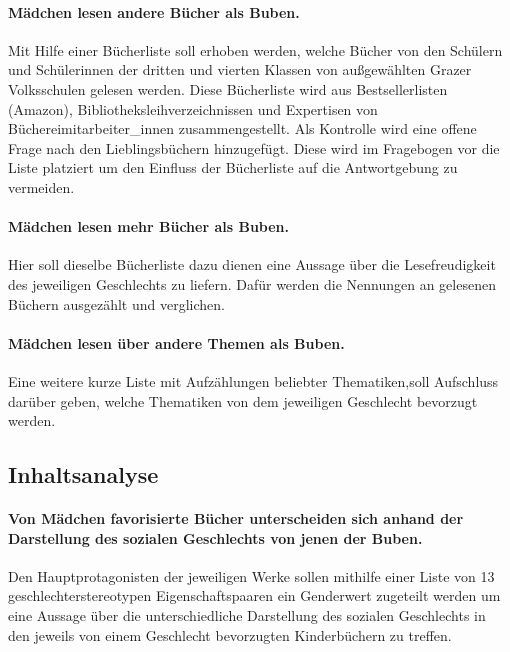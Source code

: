 \paragraph{Mädchen lesen andere Bücher als Buben.}

Mit Hilfe einer Bücherliste soll erhoben werden, welche Bücher von den
Schülern und Schülerinnen der dritten und vierten Klassen von
außgewählten Grazer Volksschulen gelesen werden. Diese Bücherliste wird
aus Bestsellerlisten (Amazon), Bibliotheksleihverzeichnissen und
Expertisen von Büchereimitarbeiter\_innen zusammengestellt. Als
Kontrolle wird eine offene Frage nach den Lieblingsbüchern hinzugefügt.
Diese wird im Fragebogen vor die Liste platziert um den Einfluss der
Bücherliste auf die Antwortgebung zu vermeiden.

\paragraph{Mädchen lesen mehr Bücher als Buben.}

Hier soll dieselbe Bücherliste dazu dienen eine Aussage über die
Lesefreudigkeit des jeweiligen Geschlechts zu liefern. Dafür werden die
Nennungen an gelesenen Büchern ausgezählt und verglichen.

\paragraph{Mädchen lesen über andere Themen als Buben.}

Eine weitere kurze Liste mit Aufzählungen beliebter Thematiken,soll
Aufschluss darüber geben, welche Thematiken von dem jeweiligen
Geschlecht bevorzugt werden.

\subsection{Inhaltsanalyse}

\paragraph{Von Mädchen favorisierte Bücher unterscheiden sich anhand der
Darstellung des sozialen Geschlechts von jenen der Buben.}

Den Hauptprotagonisten der jeweiligen Werke sollen mithilfe einer Liste
von 13 geschlechterstereotypen Eigenschaftspaaren ein Genderwert
zugeteilt werden um eine Aussage über die unterschiedliche Darstellung
des sozialen Geschlechts in den jeweils von einem Geschlecht bevorzugten
Kinderbüchern zu treffen.

